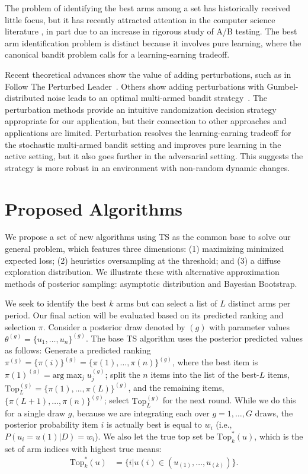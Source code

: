 \documentclass[nonblindrev]{informs3}
\newcommand{\numitems}{n}
\newcommand{\numtopset}{k}
\newcommand{\topset}{\text{Top}_k}
\begin{document}
The problem of identifying the best arms among a set has historically received little focus, but it has recently attracted attention in the computer science literature \citep{gabillon2012best,kalyanakrishnan2012pac,kaufmann2016complexity,kaufmann2013information,russo2016simple}, in part due to an increase in rigorous study of A/B testing. The best arm identification problem is distinct because it involves pure learning, where the canonical bandit problem calls for a learning-earning tradeoff. 

Recent theoretical advances show the value of adding perturbations, such as in Follow The Perturbed Leader~\citep{kalai2005efficient}. Others show adding perturbations with Gumbel-distributed noise leads to an optimal multi-armed bandit strategy~\citep{abernethy2015fighting,kujala2005following}. The perturbation methods provide an intuitive randomization decision strategy appropriate for our application, but their connection to other approaches and applications are limited. Perturbation resolves the learning-earning tradeoff for the stochastic multi-armed bandit setting and improves pure learning in the active setting, but it also goes further in the adversarial setting. This suggests the strategy is more robust in an environment with non-random dynamic changes.

\section{Proposed Algorithms} 

We propose a set of new algorithms using TS as the common base to solve our general problem, which features three dimensions: (1) maximizing minimized expected loss; (2) heuristics oversampling at the threshold; and (3) a diffuse exploration distribution. We illustrate these with alternative approximation methods of posterior sampling: asymptotic distribution and Bayesian Bootstrap.

We seek to identify the best $k$ arms but can select a list of $L$ distinct arms per period. Our final action will be evaluated based on its predicted ranking and selection $\pi$. Consider a posterior draw denoted by $(g)$ with parameter values $\theta^{(g)} = \{u_1,\ldots,u_\numitems\}^{(g)}$. The base TS algorithm uses the posterior predicted values as follows: Generate a predicted ranking $\pi^{(g)} = \{\pi(i)\}^{(g)} = \{ \pi(1),\ldots,\pi(\numitems) \}^{(g)}$, where the best item is $\pi(1)^{(g)} = \text{arg}\max_{j} u_j^{(g)}$; split the $\numitems$ items into the list of the best-$L$ items, $\text{Top}_L^{(g)}=\{ \pi(1), \ldots,\pi(L) \}^{(g)}$, and the remaining items, $\{ \pi(L+1), \ldots,\pi(\numitems) \}^{(g)}$; select $\text{Top}_L^{(g)}$ for the next round. While we do this for a single draw $g$, because we are integrating each over $g=1,\ldots,G$ draws, the posterior probability item $i$ is actually best is equal to $w_i$ (i.e., $P( u_i = u(1) | D ) = w_i$). We also let the true top set be $\topset^{*}(u)$, which is the set of arm indices with highest true means:
\begin{align}
\topset^{*}(u) &= \{i | u(i) \in ( u_{(1)},\ldots,u_{(\numtopset)} ) \} .
\end{align}
\end{document}
